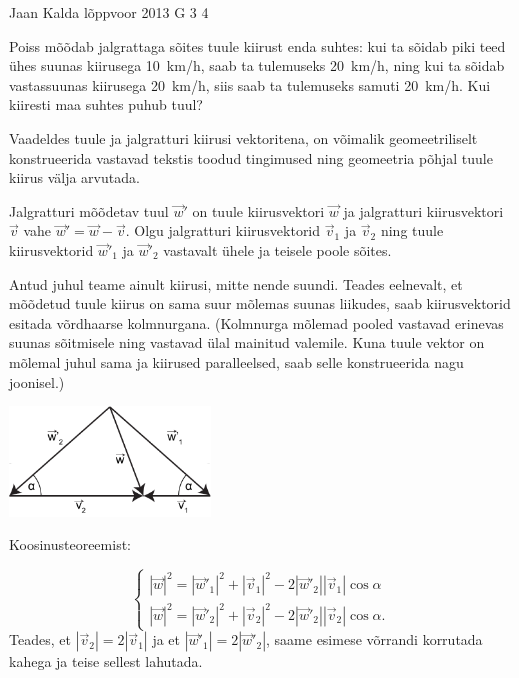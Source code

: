 {Jaan Kalda} %
{lõppvoor} %
{2013} %
{G 3} %
{4} %
{
\ifStatement
Poiss mõõdab jalgrattaga sõites tuule kiirust enda suhtes: kui ta sõidab piki teed ühes
suunas kiirusega \SI{10}{km/h}, saab ta tulemuseks \SI{20}{km/h}, ning kui ta sõidab
vastassuunas kiirusega \SI{20}{km/h}, siis saab ta tulemuseks samuti
\SI{20}{km/h}. Kui kiiresti maa suhtes puhub tuul?
\fi


\ifHint
Vaadeldes tuule ja jalgratturi kiirusi vektoritena, on võimalik geomeetriliselt konstrueerida vastavad tekstis toodud tingimused ning geomeetria põhjal tuule kiirus välja arvutada.
\fi


\ifSolution
Jalgratturi mõõdetav tuul $\vec w'$ on tuule kiirusvektori $\vec w$ ja jalgratturi kiirusvektori $\vec v$ vahe $\vec w'=\vec w - \vec v$. Olgu jalgratturi kiirusvektorid $\vec v_1$ ja $\vec v_2$ ning tuule kiirusvektorid $\vec w'_1$ ja $\vec w'_2$ vastavalt ühele ja teisele poole sõites.

Antud juhul teame ainult kiirusi, mitte nende suundi. Teades eelnevalt, et mõõdetud tuule kiirus on sama suur mõlemas suunas liikudes, saab kiirusvektorid esitada võrdhaarse kolmnurgana. (Kolmnurga mõlemad pooled vastavad erinevas suunas sõitmisele ning vastavad ülal mainitud valemile. Kuna tuule vektor on mõlemal juhul sama ja kiirused paralleelsed, saab selle konstrueerida nagu joonisel.)

\begin{center}
\includegraphics[width=0.4\textwidth]{2013-v3g-03-jalgrattur}\\
\end{center}

Koosinusteoreemist: 

$$
\begin{cases}
|\vec w|^2 = |\vec w'_1|^2 + |\vec v_1|^2 - 2 |\vec w'_2| |\vec v_1|\cos \alpha \\
|\vec w|^2 = |\vec w'_2|^2 + |\vec v_2|^2 - 2 |\vec w'_2| |\vec v_2|\cos \alpha.
\end{cases}
$$
Teades, et $ |\vec v_2|=2 |\vec v_1|$ ja et $ |\vec w'_1|=2 |\vec w'_2|$, saame esimese võrrandi korrutada kahega ja teise sellest lahutada.

}
